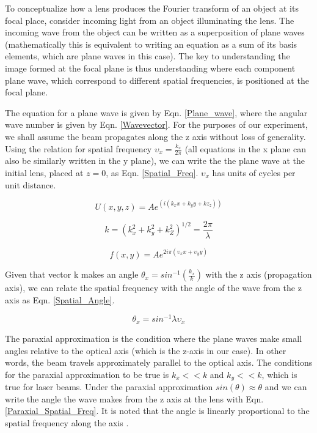\documentclass[twocolumn,amsmath,amssymb,pra]{revtex4-2}
\begin{document}
To conceptualize how a lens produces the Fourier transform of an object at its focal place, consider incoming light from an object illuminating the lens. The incoming wave from the object can be written as a superposition of plane waves (mathematically this is equivalent to writing an equation as a sum of its basis elements, which are plane waves in this case). The key to understanding the image formed at the focal plane is thus understanding where each component plane wave, which correspond to different spatial frequencies, is positioned at the focal plane\cite{tyson2014principles}. 

The equation for a plane wave is given by Eqn. \ref{Plane_wave}, where the angular wave number is given by Eqn. \ref{Wavevector}. For the purposes of our experiment, we shall assume the beam propagates along the z axis without loss of generality. Using the relation for spatial frequency $\upsilon_x = \frac{k_x}{2\pi}$ (all equations in the x plane can also be similarly written in the y plane), we can write the the plane wave at the initial lens, placed at $z = 0$, as Eqn. \ref{Spatial_Freq}. $\upsilon_x$ has units of cycles per unit distance.

\begin{equation}
    U(x,y,z) = Ae^{(i(k_xx+k_yy+kz_z))}
    \label{Plane_wave}    
\end{equation}

\begin{equation}
    k = (k_x^2+k_y^2+k_Z^2)^{1/2} = \frac{2\pi}{\lambda}
    \label{Wavevector}    
\end{equation}

\begin{equation}
    f(x,y) = Ae^{2i\pi(\upsilon_xx+\upsilon_yy)}
    \label{Spatial_Freq}
\end{equation}

Given that vector k makes an angle $\theta_x = sin^{-1}(\frac{k_x}{k})$ with the z axis (propagation axis), we can relate the spatial frequency with the angle of the wave from the z axis as Eqn. \ref{Spatial_Angle}.

\begin{equation}
    \theta_x = sin^{-1}\lambda\upsilon_x
    \label{Spatial_Angle}
\end{equation}

The paraxial approximation is the condition where the plane waves make small angles relative to the optical axis (which is the z-axis in our case). In other words, the beam travels approximately parallel to the optical axis. The conditions for the paraxial approximation to be true is $k_x<<k$ and $k_y<<k$, which is true for laser beams. Under the paraxial approximation $sin(\theta)\approx \theta$ and we can write the angle the wave makes from the z axis at the lens with Eqn. \ref{Paraxial_Spatial_Freq}. It is noted that the angle is linearly proportional to the spatial frequency along the axis \cite{tyson2014principles}.
\end{document}
